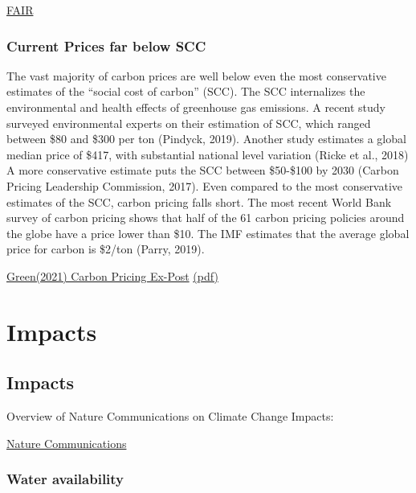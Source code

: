\documentclass[
]{book}
\begin{document}
\href{https://fair.readthedocs.io/en/latest/}{FAIR}

\hypertarget{current-prices-far-below-scc}{%
\section{Current Prices far below SCC}\label{current-prices-far-below-scc}}

The vast majority of carbon prices are
well below even the most conservative estimates of the ``social cost of carbon'' (SCC).
The SCC internalizes the environmental and health effects of greenhouse gas emissions. A recent study
surveyed environmental experts on their estimation of SCC, which ranged between \$80 and
\$300 per ton (Pindyck, 2019). Another study estimates a global median price of \$417, with
substantial national level variation (Ricke et al., 2018) A more conservative estimate puts the
SCC between \$50-\$100 by 2030 (Carbon Pricing Leadership Commission, 2017).
Even compared to the most conservative estimates of the SCC, carbon pricing falls short. The
most recent World Bank survey of carbon pricing shows that half of the 61 carbon pricing
policies around the globe have a price lower than \$10. The IMF estimates that the average
global price for carbon is \$2/ton (Parry, 2019).

\href{https://iopscience.iop.org/article/10.1088/1748-9326/abdae9/meta}{Green(2021) Carbon Pricing Ex-Post}
\href{pdf/Green_2021_Carbon_Pricing_Ex-Post.pdf}{(pdf)}

\hypertarget{part-impacts}{%
\part{Impacts}\label{part-impacts}}

\hypertarget{impacts}{%
\chapter{Impacts}\label{impacts}}

Overview of Nature Communications on Climate Change Impacts:

\href{https://www.nature.com/collections/hcfhgcahdc}{Nature Communications}

\hypertarget{water-availability}{%
\section{Water availability}\label{water-availability}}
\end{document}
